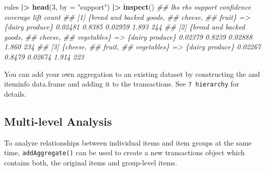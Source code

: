 \documentclass[
  notitlepage]{book}
\newenvironment{Shaded}{\begin{snugshade}}{\end{snugshade}}
\newcommand{\CommentTok}[1]{\textcolor[rgb]{0.56,0.35,0.01}{\textit{#1}}}
\newcommand{\DataTypeTok}[1]{\textcolor[rgb]{0.13,0.29,0.53}{#1}}
\newcommand{\DecValTok}[1]{\textcolor[rgb]{0.00,0.00,0.81}{#1}}
\newcommand{\ErrorTok}[1]{\textcolor[rgb]{0.64,0.00,0.00}{\textbf{#1}}}
\newcommand{\KeywordTok}[1]{\textcolor[rgb]{0.13,0.29,0.53}{\textbf{#1}}}
\newcommand{\NormalTok}[1]{#1}
\newcommand{\OperatorTok}[1]{\textcolor[rgb]{0.81,0.36,0.00}{\textbf{#1}}}
\newcommand{\StringTok}[1]{\textcolor[rgb]{0.31,0.60,0.02}{#1}}
\begin{document}
\begin{Shaded}
\begin{Highlighting}[]
\NormalTok{rules }\OperatorTok{|}\ErrorTok{\textgreater{}}\StringTok{ }\KeywordTok{head}\NormalTok{(}\DecValTok{3}\NormalTok{, }\DataTypeTok{by =} \StringTok{"support"}\NormalTok{) }\OperatorTok{|}\ErrorTok{\textgreater{}}\StringTok{ }\KeywordTok{inspect}\NormalTok{()}
\CommentTok{\#\#     lhs                          rhs             support confidence coverage  lift count}
\CommentTok{\#\# [1] \{bread and backed goods,                                                            }
\CommentTok{\#\#      cheese,                                                                            }
\CommentTok{\#\#      fruit\}                   =\textgreater{} \{dairy produce\} 0.02481     0.8385  0.02959 1.893   244}
\CommentTok{\#\# [2] \{bread and backed goods,                                                            }
\CommentTok{\#\#      cheese,                                                                            }
\CommentTok{\#\#      vegetables\}              =\textgreater{} \{dairy produce\} 0.02379     0.8239  0.02888 1.860   234}
\CommentTok{\#\# [3] \{cheese,                                                                            }
\CommentTok{\#\#      fruit,                                                                             }
\CommentTok{\#\#      vegetables\}              =\textgreater{} \{dairy produce\} 0.02267     0.8479  0.02674 1.914   223}
\end{Highlighting}
\end{Shaded}

You can add your own aggregation to an existing dataset by constructing
the and iteminfo data.frame and adding it to the transactions. See \texttt{?\ hierarchy}
for details.

\hypertarget{multi-level-analysis}{%
\subsection{Multi-level Analysis}\label{multi-level-analysis}}

To analyze relationships between individual items and item groups at the same time, \texttt{addAggregate()} can be used to create a new transactions object which contains both, the original items and group-level items.
\end{document}
